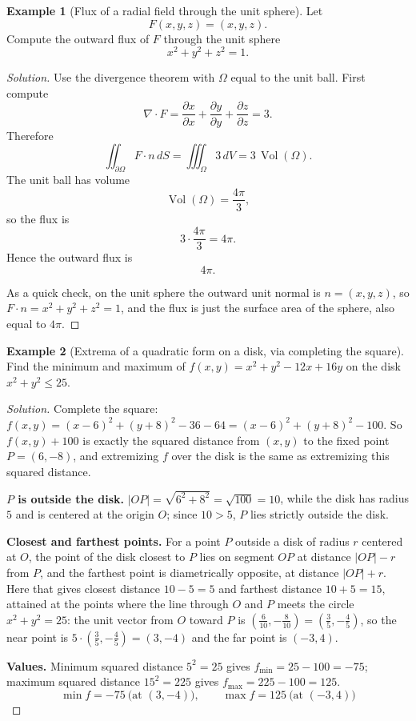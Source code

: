\documentclass[11pt]{article}
\theoremstyle{definition}
\newtheorem{example}{Example}[section]
\begin{document}
\begin{example}[Flux of a radial field through the unit sphere]
Let
\[
F(x,y,z)=(x,y,z).
\]
Compute the outward flux of $F$ through the unit sphere
\[
x^2+y^2+z^2=1.
\]
\end{example}

\begin{proof}[Solution]
Use the divergence theorem with $\Omega$ equal to the unit ball. First compute
\[
\nabla\cdot F = \frac{\partial x}{\partial x}+\frac{\partial y}{\partial y}+\frac{\partial z}{\partial z}=3.
\]
Therefore
\[
\iint_{\partial \Omega} F\cdot n\,dS = \iiint_{\Omega} 3\,dV = 3\,\operatorname{Vol}(\Omega).
\]
The unit ball has volume
\[
\operatorname{Vol}(\Omega)=\frac{4\pi}{3},
\]
so the flux is
\[
3\cdot \frac{4\pi}{3}=4\pi.
\]
Hence the outward flux is
\[
\boxed{4\pi}.
\]

As a quick check, on the unit sphere the outward unit normal is $n=(x,y,z)$, so $F\cdot n=x^2+y^2+z^2=1$, and the flux is just the surface area of the sphere, also equal to $4\pi$.
\end{proof}

\begin{example}[Extrema of a quadratic form on a disk, via completing the square]
Find the minimum and maximum of $f(x,y)=x^2+y^2-12x+16y$ on the disk $x^2+y^2\le25$.
\end{example}
\begin{proof}[Solution]
Complete the square: $f(x,y)=(x-6)^2+(y+8)^2-36-64=(x-6)^2+(y+8)^2-100$. So $f(x,y)+100$ is exactly the squared distance from $(x,y)$ to the fixed point $P=(6,-8)$, and extremizing $f$ over the disk is the same as extremizing this squared distance.

\textbf{$P$ is outside the disk.} $|OP|=\sqrt{6^2+8^2}=\sqrt{100}=10$, while the disk has radius $5$ and is centered at the origin $O$; since $10>5$, $P$ lies strictly outside the disk.

\textbf{Closest and farthest points.} For a point $P$ outside a disk of radius $r$ centered at $O$, the point of the disk closest to $P$ lies on segment $OP$ at distance $|OP|-r$ from $P$, and the farthest point is diametrically opposite, at distance $|OP|+r$. Here that gives closest distance $10-5=5$ and farthest distance $10+5=15$, attained at the points where the line through $O$ and $P$ meets the circle $x^2+y^2=25$: the unit vector from $O$ toward $P$ is $\left(\tfrac6{10},-\tfrac8{10}\right)=\left(\tfrac35,-\tfrac45\right)$, so the near point is $5\cdot\left(\tfrac35,-\tfrac45\right)=(3,-4)$ and the far point is $(-3,4)$.

\textbf{Values.} Minimum squared distance $5^2=25$ gives $f_{\min}=25-100=-75$; maximum squared distance $15^2=225$ gives $f_{\max}=225-100=125$.
\[
\boxed{\min f=-75\ \text{(at }(3,-4)\text{)},\qquad \max f=125\ \text{(at }(-3,4)\text{)}}
\]
\end{proof}
\end{document}
